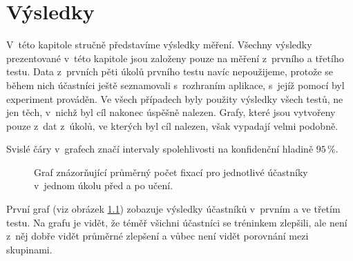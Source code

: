 \chapter{Výsledky}

V~této kapitole stručně představíme výsledky měření. Všechny výsledky
prezentované v~této kapitole jsou založeny pouze na měření z~prvního a třetího
testu. Data z~prvních pěti úkolů prvního testu navíc nepoužijeme, protože se
během nich účastníci ještě seznamovali s~rozhraním aplikace, s~jejíž pomocí byl
experiment prováděn. Ve všech případech byly použity výsledky všech testů, ne
jen těch, v~nichž byl cíl nakonec úspěšně nalezen. Grafy, které jsou vytvořeny
pouze z~dat z~úkolů, ve kterých byl cíl nalezen, však vypadají velmi podobně.

Svislé čáry v~grafech značí intervaly spolehlivosti na konfidenční hladině $95\,\%$.

\def\graphfigure#1#2#3{
\begin{figure}[h!]
\centering
\caption{#2}
\label{#3}
\end{figure}
}

\graphfigure{predpo_grid}{Graf znázorňující průměrný počet fixací pro jednotlivé účastníky v~jednom úkolu před a po učení.}{beforeall}

\long{}

První graf (viz obrázek \ref{beforeall}) zobazuje výsledky účastníků v~prvním a ve třetím testu. Na grafu je vidět, že téměř všichni účastníci se tréninkem zlepšili, ale není z~něj dobře vidět průměrné zlepšení a vůbec není vidět porovnání mezi skupinami.


